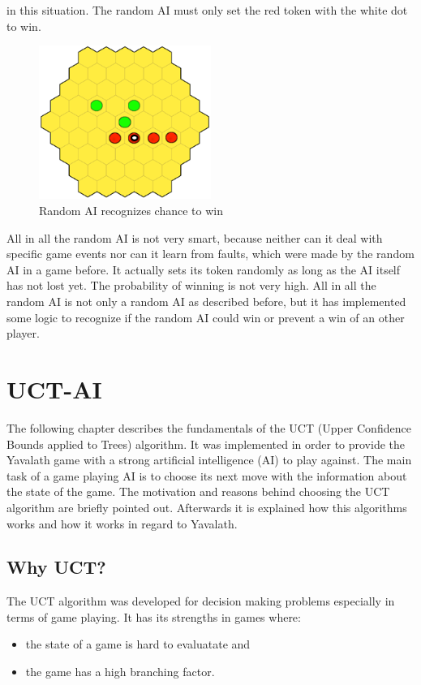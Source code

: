 \documentclass[english]{report} \usepackage[english]{babel}
\begin{document}
in this situation. The random AI must only set the red token with the white dot
to win.
\begin{figure}[ht]
\centering
\includegraphics[width=0.5\textwidth]{Abbildungen/randomAI3.png}
\caption{Random AI recognizes chance to win }
\label{fig:randomAI3}
\end{figure}
All in all the random AI is not very smart, because neither can it deal with
specific game events nor can it learn from faults, which were made by the random AI
in a game before. It actually sets its token randomly as long as the AI itself
has not lost yet.
The probability of winning is not very high. All in all the random AI is not only a
random AI as described before, but it has implemented some logic to
recognize if the random AI could win or prevent a win of an other player.


\section{UCT-AI}
\label{sec:chapter4}
The following chapter describes the fundamentals of the UCT (Upper Confidence
Bounds applied to Trees) algorithm. It was implemented in order to provide the
Yavalath game with a strong artificial intelligence (AI) to play against. The main
task of a game playing AI is to choose its next move with the information about
the state of the game. The motivation and reasons behind choosing the UCT
algorithm are briefly pointed out. Afterwards it is explained how this
algorithms works and how it works in regard to Yavalath.

\subsection{Why UCT?}
The UCT algorithm was developed for decision making problems especially in terms
of game playing. It has its strengths in games where:
\begin{itemize}
	\item the state of a game is hard to evaluatate and
	\item the game has a high branching factor.\cite{wiki:mcts}
\end{itemize}
\end{document}
